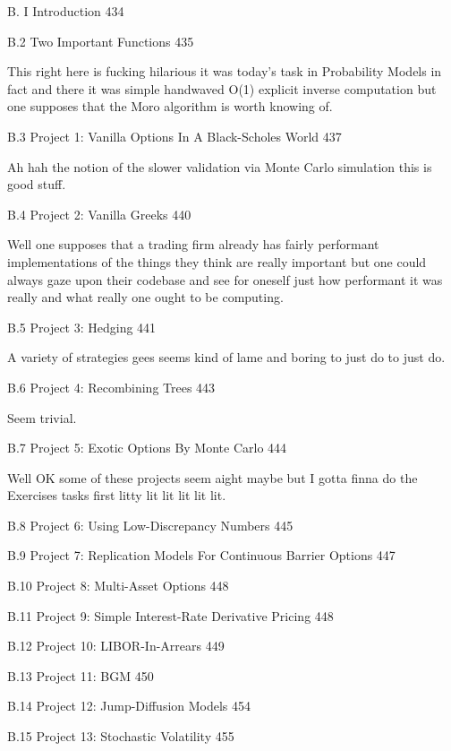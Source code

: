 B. I Introduction 434



B.2 Two Important Functions 435

This right here is fucking hilarious it was today's task in Probability Models in fact and there it was simple handwaved O(1) explicit inverse computation but one supposes that the Moro algorithm is worth knowing of.

B.3 Project 1: Vanilla Options In A Black-Scholes World 437

Ah hah the notion of the slower validation via Monte Carlo simulation this is good stuff.

B.4 Project 2: Vanilla Greeks 440

Well one supposes that a trading firm already has fairly performant implementations of the things they think are really important but one could always gaze upon their codebase and see for oneself just how performant it was really and what really one ought to be computing.

B.5 Project 3: Hedging 441

A variety of strategies gees seems kind of lame and boring to just do to just do.

B.6 Project 4: Recombining Trees 443

Seem trivial.

B.7 Project 5: Exotic Options By Monte Carlo 444

Well OK some of these projects seem aight maybe but I gotta finna do the Exercises tasks first litty lit lit lit lit lit.

B.8 Project 6: Using Low-Discrepancy Numbers 445



B.9 Project 7: Replication Models For Continuous Barrier Options 447



B.10 Project 8: Multi-Asset Options 448



B.11 Project 9: Simple Interest-Rate Derivative Pricing 448



B.12 Project 10: LIBOR-In-Arrears 449



B.13 Project 11: BGM 450



B.14 Project 12: Jump-Diffusion Models 454



B.15 Project 13: Stochastic Volatility 455



